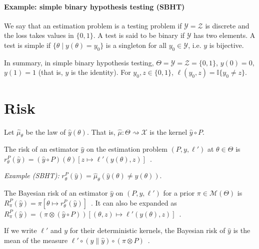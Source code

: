 \paragraph{Example: simple binary hypothesis testing (SBHT)}

We say that an estimation problem is a testing problem if $\mathcal Y = \mathcal Z$ is discrete and the loss takes values in $\{0, 1\}$.
A test is said to be binary if $\mathcal Y$ has two elements.
A test is simple if $\{\theta \mid y(\theta) = y_0\}$ is a singleton for all $y_0 \in \mathcal Y$, i.e. $y$ is bijective.

In summary, in simple binary hypothesis testing, $\Theta = \mathcal Y = \mathcal Z = \{0,1\}$, $y(0) = 0$, $y(1) = 1$ (that is, $y$ is the identity). For $y_0, z \in \{0,1\}$, $\ell(y_0, z) = \mathbb{I}\{y_0 \ne z\}$.

\section{Risk}

Let $\hat{\mu}_\theta$ be the law of $\hat{y}(\theta)$. That is, $\hat{\mu} : \mathcal \Theta \rightsquigarrow \mathcal X$ is the kernel $\hat{y} \circ P$.

\begin{definition}[Risk]
  \label{def:risk}
  \mathlibok
  The risk of an estimator $\hat{y}$ on the estimation problem $(P, y, \ell')$ at $\theta \in \Theta$ is $r^P_\theta(\hat{y}) = (\hat{y} \circ P)(\theta)\left[z \mapsto \ell'(y(\theta), z)\right]$~.
\end{definition}

\emph{Example (SBHT):} $r^P_\theta(\hat{y}) = \hat{\mu}_\theta(\hat{y}(\theta) \ne y(\theta))$.


\begin{definition}
  \label{def:bayesianRisk}
  \mathlibok
  The Bayesian risk of an estimator $\hat{y}$ on $(P, y, \ell')$ for a prior $\pi \in \mathcal M(\Theta)$ is $R^P_\pi(\hat{y}) = \pi\left[\theta \mapsto r^P_\theta(\hat{y})\right]$~. It can also be expanded as $R^P_\pi(\hat{y}) = (\pi \otimes (\hat{y} \circ P))\left[ (\theta, z) \mapsto \ell'(y(\theta), z) \right]$~.
\end{definition}

If we write $\ell'$ and $y$ for their deterministic kernels, the Bayesian risk of $\hat{y}$ is the mean of the measure $\ell' \circ (y \parallel \hat{y}) \circ (\pi \otimes P)$~.


